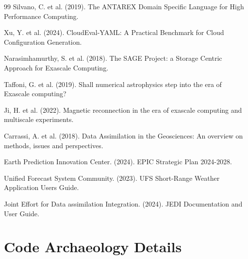 \documentclass[11pt,twocolumn]{article}
\begin{document}
\begin{thebibliography}{99}
Silvano, C. et al. (2019).
\newblock The ANTAREX Domain Specific Language for High Performance Computing.

Xu, Y. et al. (2024).
\newblock CloudEval-YAML: A Practical Benchmark for Cloud Configuration Generation.

Narasimhamurthy, S. et al. (2018).
\newblock The SAGE Project: a Storage Centric Approach for Exascale Computing.

Taffoni, G. et al. (2019).
\newblock Shall numerical astrophysics step into the era of Exascale computing?

Ji, H. et al. (2022).
\newblock Magnetic reconnection in the era of exascale computing and multiscale experiments.

Carrassi, A. et al. (2018).
\newblock Data Assimilation in the Geosciences: An overview on methods, issues and perspectives.

Earth Prediction Innovation Center. (2024).
\newblock EPIC Strategic Plan 2024-2028.

Unified Forecast System Community. (2023).
\newblock UFS Short-Range Weather Application Users Guide.

Joint Effort for Data assimilation Integration. (2024).
\newblock JEDI Documentation and User Guide.

\end{thebibliography}

\appendix

\section{Code Archaeology Details}
\end{document}
